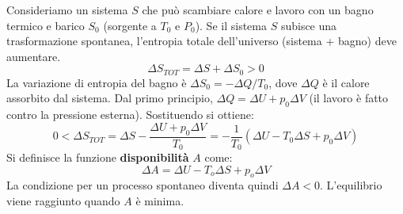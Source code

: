 Consideriamo un sistema $S$ che può scambiare calore e lavoro con un bagno termico e barico $S_0$ (sorgente a $T_0$ e $P_0$). Se il sistema $S$ subisce una trasformazione spontanea, l'entropia totale dell'universo (sistema + bagno) deve aumentare.
\begin{equation}
    \Delta S_{TOT}=\Delta S+\Delta S_{0}>0
\end{equation}
La variazione di entropia del bagno è $\Delta S_0 = - \Delta Q / T_0$, dove $\Delta Q$ è il calore assorbito dal sistema. Dal primo principio, $\Delta Q = \Delta U + p_0 \Delta V$ (il lavoro è fatto contro la pressione esterna).
Sostituendo si ottiene:
\begin{equation}
    0 < \Delta S_{TOT} = \Delta S - \frac{\Delta U + p_0 \Delta V}{T_0} = -\frac{1}{T_0}(\Delta U - T_0 \Delta S + p_0 \Delta V)
\end{equation}
Si definisce la funzione \textbf{disponibilità} $A$ come:
\begin{equation}
    \Delta A=\Delta U-T_{o}\Delta S+p_{o}\Delta V
    \label{eq:disponibilita}
\end{equation}
La condizione per un processo spontaneo diventa quindi $\Delta A < 0$. L'equilibrio viene raggiunto quando $A$ è minima.

